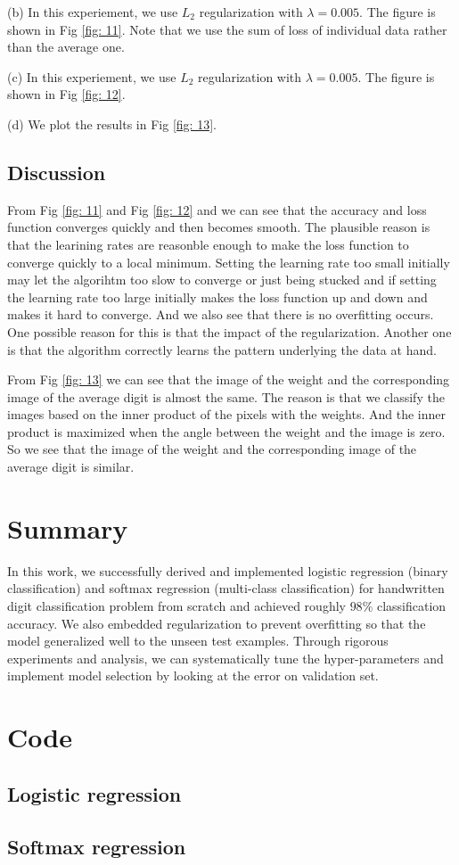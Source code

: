 \documentclass{article} %
\begin{document}
(b) In this experiement, we use $L_2$ regularization with $\lambda = 0.005$. The figure is shown in Fig \ref{fig: 11}. Note that we use the sum of loss of individual data rather than the average one.


(c) In this experiement, we use $L_2$ regularization with $\lambda = 0.005$. The figure is shown in Fig \ref{fig: 12}.

(d) We plot the results in Fig \ref{fig: 13}.


\subsection{Discussion}
From Fig \ref{fig: 11} and Fig \ref{fig: 12} and we can see that the accuracy and loss function converges quickly and then becomes smooth. The plausible reason is that the learining rates are reasonble enough to make the loss function to converge quickly to a local minimum. Setting the learning rate too small initially may let the algorihtm too slow to converge or just being stucked and if setting the learning rate too large initially makes the loss function up and down and makes it hard to converge. And we also see that there is no overfitting occurs. One possible reason for this is that the impact of the regularization. Another one is that the algorithm correctly learns the pattern underlying the data at hand.

From Fig \ref{fig: 13} we can see that the image of the weight and the corresponding image of the average digit is almost the same. The reason is that we classify the images based on the inner product of the pixels with the weights. And the inner product is maximized when the angle between the weight and the image is zero. So we see that the image of the weight and the corresponding image of the average digit is similar.

\section{Summary}
In this work, we successfully derived and implemented logistic regression (binary classification) and softmax regression (multi-class classification) for handwritten digit classification problem from scratch and achieved roughly $98\%$ classification accuracy. We also embedded regularization to prevent overfitting so that the model generalized well to the unseen test examples. Through rigorous experiments and analysis, we can systematically tune the hyper-parameters and implement model selection by looking at the error on validation set. 

\section{Code}
\subsection{Logistic regression}

\subsection{Softmax regression}
\end{document}
